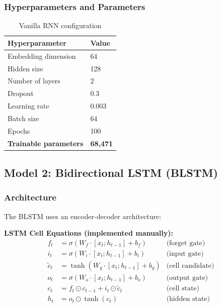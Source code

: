 \documentclass[11pt,a4paper]{article}
\begin{document}
\subsubsection{Hyperparameters and Parameters}
\begin{table}[H]
\centering
\caption{Vanilla RNN configuration}
\renewcommand{\arraystretch}{1.3}
\begin{tabularx}{\textwidth}{lX}
\toprule
\textbf{Hyperparameter} & \textbf{Value} \\
\midrule
Embedding dimension & 64 \\
Hidden size & 128 \\
Number of layers & 2 \\
Dropout & 0.3 \\
Learning rate & 0.003 \\
Batch size & 64 \\
Epochs & 100 \\
\midrule
\textbf{Trainable parameters} & \textbf{68,471} \\
\bottomrule
\end{tabularx}
\end{table}

\subsection{Model 2: Bidirectional LSTM (BLSTM)}

\subsubsection{Architecture}

The BLSTM uses an encoder-decoder architecture:

\textbf{LSTM Cell Equations (implemented manually):}
\begin{align}
f_t &= \sigma(W_f \cdot [x_t; h_{t-1}] + b_f) & \text{(forget gate)} \\
i_t &= \sigma(W_i \cdot [x_t; h_{t-1}] + b_i) & \text{(input gate)} \\
\tilde{c}_t &= \tanh(W_g \cdot [x_t; h_{t-1}] + b_g) & \text{(cell candidate)} \\
o_t &= \sigma(W_o \cdot [x_t; h_{t-1}] + b_o) & \text{(output gate)} \\
c_t &= f_t \odot c_{t-1} + i_t \odot \tilde{c}_t & \text{(cell state)} \\
h_t &= o_t \odot \tanh(c_t) & \text{(hidden state)}
\end{align}
\end{document}
